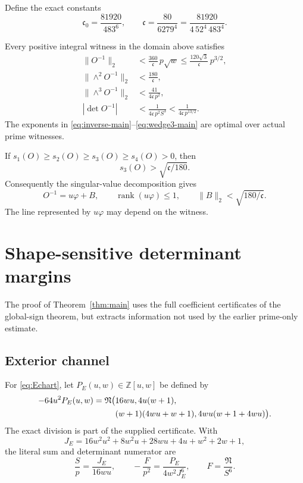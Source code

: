 Define the exact constants
\begin{equation}\label{eq:constants}
 \mathfrak c_0=\frac{81920}{483^6},
 \qquad
 \mathfrak c=\frac{80}{6279^4}
 =\frac{81920}{4\,52^4\,483^4}.
\end{equation}

\begin{theorem}\label{thm:main}
Every positive integral witness in the domain above satisfies
\begin{align}
 \|O^{-1}\|_2
 &<\frac{360}{\mathfrak c}\,p\sqrt w
 \le\frac{120\sqrt3}{\mathfrak c}\,p^{3/2},\label{eq:inverse-main}\\
 \|\wedge^2O^{-1}\|_2
 &<\frac{180}{\mathfrak c},\label{eq:wedge2-main}\\
 \|\wedge^3O^{-1}\|_2
 &<\frac{41}{4\mathfrak c\,p^2},\label{eq:wedge3-main}\\
 |\det O^{-1}|
 &<\frac1{4\mathfrak c\,p^2S^3}
 <\frac1{4\mathfrak c\,p^{13/2}}.\label{eq:detinv-main}
\end{align}
The exponents in \eqref{eq:inverse-main}--\eqref{eq:wedge3-main} are optimal
over actual prime witnesses.

If \(s_1(O)\ge s_2(O)\ge s_3(O)\ge s_4(O)>0\), then
\[
 s_3(O)>\sqrt{\mathfrak c/180}.
\]
Consequently the singular-value decomposition gives
\begin{equation}\label{eq:rankone}
 O^{-1}=u\varphi+B,
 \qquad \operatorname{rank}(u\varphi)\le1,
 \qquad \|B\|_2<\sqrt{180/\mathfrak c}.
\end{equation}
The line represented by \(u\varphi\) may depend on the witness.
\end{theorem}

\section{Shape-sensitive determinant margins}

The proof of Theorem~\ref{thm:main} uses the full coefficient certificates of
the global-sign theorem, but extracts information not used by the earlier
prime-only estimate.

\subsection{Exterior channel}

For \eqref{eq:Echart}, let \(P_E(u,w)\in\mathbb Z[u,w]\) be defined by
\begin{align}
 -64u^2P_E(u,w)=\mathfrak N\bigl(&16wu,4u(w+1),\notag\\
 &(w+1)(4wu+w+1),4wu(w+1+4wu)\bigr).\label{eq:PE}
\end{align}
The exact division is part of the supplied certificate. With
\[
 J_E=16w^2u^2+8w^2u+28wu+4u+w^2+2w+1,
\]
the literal sum and determinant numerator are
\begin{equation}\label{eq:Escale}
 \frac Sp=\frac{J_E}{16wu},
 \qquad
 -\frac{F}{p^2}=\frac{P_E}{4w^2J_E^6},
 \qquad F=\frac{\mathfrak N}{S^6}.
\end{equation}

